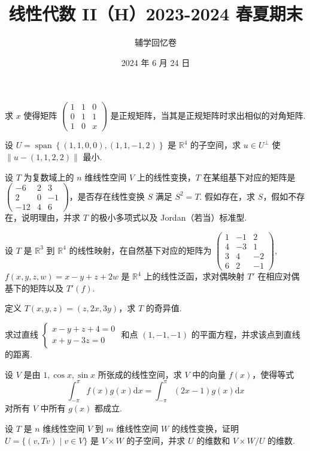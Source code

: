\documentclass[UTF8,14pt,normal]{ctexart}
\title{\textbf{线性代数 II（H）2023-2024 春夏期末}}
\author{辅学回忆卷}
\date{2024 年 6 月 24 日}
\begin{document}
\maketitle

 求 $x$ 使得矩阵 $\begin{pmatrix}1&1&0\\0&1&1\\1&0&x\end{pmatrix}$ 是正规矩阵，当其是正规矩阵时求出相似的对角矩阵.

 设 $U=\operatorname{span}\left\{(1,1,0,0),(1,1,-1,2)\right\}$ 是 $\mathbb{R}^4$ 的子空间，求 $u\in U^\perp$ 使 $\|u-(1,1,2,2)\|$ 最小.

 设 $T$ 为复数域上的 $n$ 维线性空间 $V$ 上的线性变换，$T$ 在某组基下对应的矩阵是 $\begin{pmatrix}-6&2&3\\2&0&-1\\-12&4&6\end{pmatrix}$，是否存在线性变换 $S$ 满足 $S^2=T$. 假如存在，求 $S$，假如不存在，说明理由，并求 $T$ 的极小多项式以及 Jordan（若当）标准型.

 设 $T$ 是 $\mathbb{R}^3$ 到 $\mathbb{R}^4$ 的线性映射，在自然基下对应的矩阵为 $\begin{pmatrix}1&-1&2\\4&-3&1\\3&4&-2\\6&2&-1\end{pmatrix}$, $f(x,y,z,w)=x-y+z+2w$ 是 $\mathbb{R}^4$ 上的线性泛函，求对偶映射 $T'$ 在相应对偶基下的矩阵以及 $T'(f)$.

 定义 $T(x,y,z) = (z,2x,3y)$，求 $T$ 的奇异值.

 求过直线 $\begin{cases}x-y+z+4=0\\x+y-3z=0\end{cases}$ 和点 $(1,-1,-1)$ 的平面方程，并求该点到直线的距离.

 设 $V$ 是由 $1, \cos x, \sin x$ 所张成的线性空间，求 $V$ 中的向量 $f(x)$，使得等式 \[\int_{-\pi}^{\pi}f(x)g(x)\mathrm{d}x=\int_{-\pi}^{\pi}(2x-1)g(x)\mathrm{d}x\] 对所有 $V$ 中所有 $g(x)$ 都成立.

 设 $T$ 是 $n$ 维线性空间 $V$ 到 $m$ 维线性空间 $W$ 的线性变换，证明 $U=\{(v,Tv)\mid v \in V\}$ 是 $V\times W$ 的子空间，并求 $U$ 的维数和 $V\times W /U$ 的维数.
\end{document}
